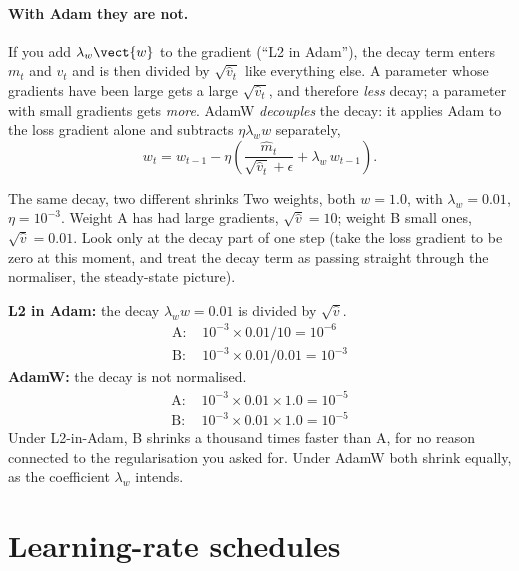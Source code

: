 \paragraph{With Adam they are not.} If you add $\lambda_w\vect{w}$ to the gradient (``L2 in
Adam''), the decay term enters $m_t$ and $v_t$ and is then divided by $\sqrt{\hat{v}_t}$ like
everything else. A parameter whose gradients have been large gets a large $\sqrt{\hat{v}_t}$, and
therefore \emph{less} decay; a parameter with small gradients gets \emph{more}. AdamW
\citep{loshchilov2019decoupled} \emph{decouples} the decay: it applies Adam to the loss gradient
alone and subtracts $\eta\lambda_w w$ separately,
\begin{equation}\label{eq:trainloop:adamw}
w_t = w_{t-1} - \eta\left(\frac{\hat{m}_t}{\sqrt{\hat{v}_t} + \epsilon} + \lambda_w\,w_{t-1}\right).
\end{equation}

\begin{worked}[label={we:trainloop:adamw}]{The same decay, two different shrinks}
Two weights, both $w = 1.0$, with $\lambda_w = 0.01$, $\eta = 10^{-3}$. Weight A has had large
gradients, $\sqrt{\hat{v}} = 10$; weight B small ones, $\sqrt{\hat{v}} = 0.01$. Look only at the
decay part of one step (take the loss gradient to be zero at this moment, and treat the
decay term as passing straight through the normaliser, the steady-state picture).

\textbf{L2 in Adam:} the decay $\lambda_w w = 0.01$ is divided by $\sqrt{\hat{v}}$.
\begin{align*}
\text{A: } & 10^{-3} \times 0.01 / 10 = 10^{-6}\\
\text{B: } & 10^{-3} \times 0.01 / 0.01 = 10^{-3}
\end{align*}
\textbf{AdamW:} the decay is not normalised.
\begin{align*}
\text{A: } & 10^{-3} \times 0.01 \times 1.0 = 10^{-5}\\
\text{B: } & 10^{-3} \times 0.01 \times 1.0 = 10^{-5}
\end{align*}
Under L2-in-Adam, B shrinks a thousand times faster than A, for no reason connected to the
regularisation you asked for. Under AdamW both shrink equally, as the coefficient $\lambda_w$
intends.
\end{worked}

\section{Learning-rate schedules}\label{sec:trainloop:schedule}

